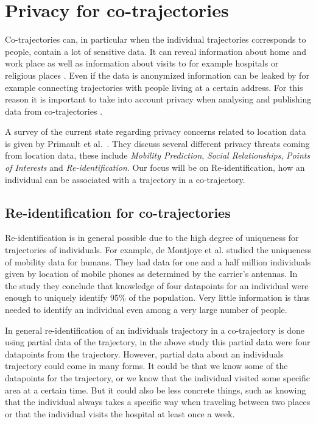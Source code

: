 \documentclass[12pt]{article}
\theoremstyle{definition}
\begin{document}
\section{Privacy for co-trajectories}
\label{sec:priv-co-traj}
Co-trajectories can, in particular when the individual trajectories
corresponds to people, contain a lot of sensitive data. It can reveal
information about home and work place as well as information about
visits to for example hospitals or religious places
\cite{gambs_show_2010}. Even if the data is anonymized information can
be leaked by for example connecting trajectories with people living at
a certain address. For this reason it is important to take into
account privacy when analysing and publishing data from
co-trajectories \cite{taylor_no_2016}.

A survey of the current state regarding privacy concerns related to
location data is given by Primault et al.~\cite{primault_long_2018}.
They discuss several different privacy threats coming from location
data, these include \emph{Mobility Prediction}, \emph{Social
  Relationships}, \emph{Points of Interests} and
\emph{Re-identification}. Our focus will be on Re-identification, how
an individual can be associated with a trajectory in a co-trajectory.

\subsection{Re-identification for co-trajectories}
\label{sec:re-identification-co}
Re-identification is in general possible due to the high degree of
uniqueness for trajectories of individuals. For example, de Montjoye
et al. \cite{de_montjoye_unique_2013} studied the uniqueness of
mobility data for humans. They had data for one and a half million
individuals given by location of mobile phones as determined by the
carrier's antennas. In the study they conclude that knowledge of four
datapoints for an individual were enough to uniquely identify 95\% of
the population. Very little information is thus needed to identify an
individual even among a very large number of people.

In general re-identification of an individuals trajectory in a
co-trajectory is done using partial data of the trajectory, in the
above study this partial data were four datapoints from the
trajectory. However, partial data about an individuals trajectory
could come in many forms. It could be that we know some of the
datapoints for the trajectory, or we know that the individual
visited some specific area at a certain time. But it could also be
less concrete things, such as knowing that the individual always takes
a specific way when traveling between two places or that the
individual visits the hospital at least once a week.
\end{document}
